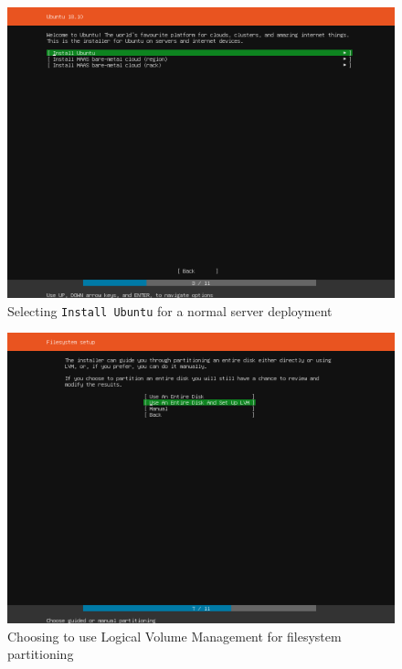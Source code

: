 \pagebreak
\begin{figure}[h!]
\centering
\captionsetup{skip=\skipfigurecaptionlen}
\includegraphics[width=1\textwidth]{screenshots/IY2D502-2019-02-21-19-16-06.png}
\caption{Selecting \texttt{Install Ubuntu} for a normal server deployment}
\label{fig:IY2D502-2019-02-21-19-16-06}
\end{figure}
\pagebreak
\begin{figure}[h!]
\centering
\captionsetup{skip=\skipfigurecaptionlen}
\includegraphics[width=1\textwidth]{screenshots/IY2D502-2019-02-21-19-16-38.png}
\caption{Choosing to use Logical Volume Management for filesystem partitioning}
\label{fig:IY2D502-2019-02-21-19-16-38}
\end{figure}
